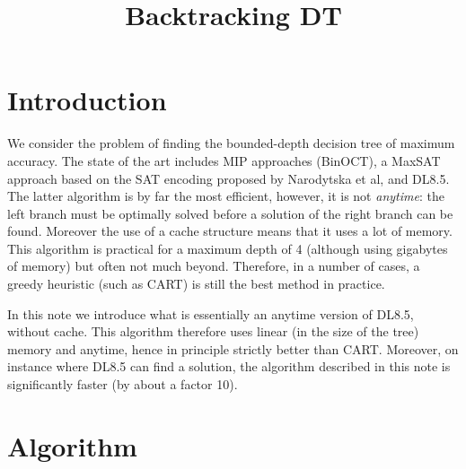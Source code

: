 \documentclass{article}
\title{Backtracking DT}
\begin{document}

\maketitle

\section*{Introduction}

We consider the problem of finding the bounded-depth decision tree of maximum accuracy.
The state of the art includes MIP approaches (BinOCT), a MaxSAT approach based on the SAT encoding proposed by Narodytska et al, and DL8.5.
The latter algorithm is by far the most efficient, however, it is not \emph{anytime}: the left branch must be optimally solved before a solution of the right branch can be found. Moreover the use of a cache structure means that it uses a lot of memory. This algorithm is practical for a maximum depth of 4 (although using gigabytes of memory) but often not much beyond. Therefore, in a number of cases, a greedy heuristic (such as CART) is still the best method in practice.

\medskip

In this note we introduce what is essentially an anytime version of DL8.5, without cache.
This algorithm therefore uses linear (in the size of the tree) memory and anytime, hence in principle strictly better than CART. Moreover, on instance where DL8.5 can find a solution, the algorithm described in this note is significantly faster (by about a factor 10).

\clearpage

\section*{Algorithm}
\end{document}
